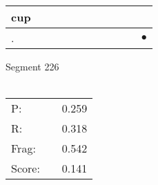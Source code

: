 \documentclass[landscape]{article}
\newcommand{\ssp}{\hspace{2pt}}
\newcommand{\mex}{\cellcolor{g}$\bullet$}
\begin{document}
\begin{tabular}{|l|p{10pt}|p{10pt}|p{10pt}|p{10pt}|p{10pt}|p{10pt}|p{10pt}|p{10pt}|p{10pt}|p{10pt}|}
\hline
\ssp cup \ssp&\hspace{2pt}&\hspace{2pt}&\hspace{2pt}&\hspace{2pt}&\hspace{2pt}&\hspace{2pt}&\hspace{2pt}&\hspace{2pt}&\hspace{2pt}&\hspace{2pt}\\
\hline
\ssp \cellcolor{ref9}. \ssp&\hspace{2pt}&\hspace{2pt}&\hspace{2pt}&\hspace{2pt}&\hspace{2pt}&\hspace{2pt}&\hspace{2pt}&\hspace{2pt}&\hspace{2pt}&\hspace{2pt}\mex\\
\hline
\end{tabular}

\vspace{6pt}
\noindent Segment 226\\\\
\noindent\begin{tabular}{lm{12pt}r}
\hline
P:&&0.259\\
R:&&0.318\\
Frag:&&0.542\\
Score:&&0.141\\
\end{tabular}

\newpage
\end{document}
